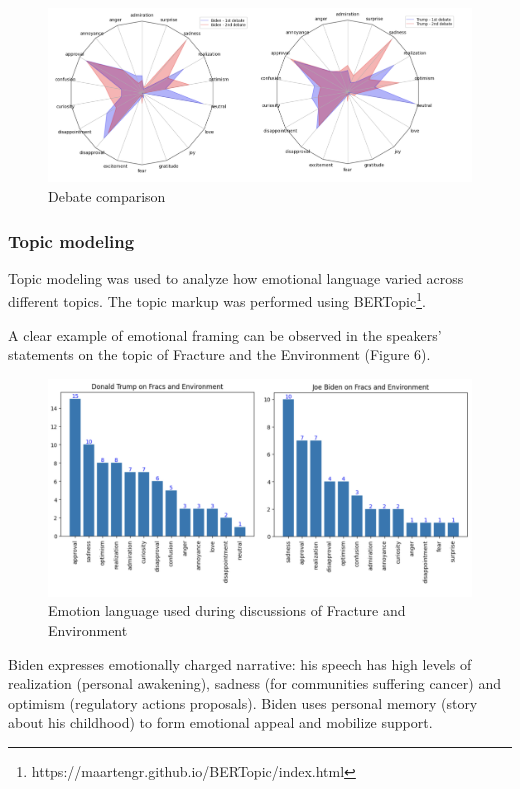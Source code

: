 \documentclass[pdflatex,sn-mathphys-num]{sn-jnl}%
\begin{document}
\begin{figure}[h]
	\centering
	\includegraphics[width=14cm]{f5-debate_comparison.png}
	\caption{Debate comparison}
\end{figure}

\subsubsection{Topic modeling}

Topic modeling was used to analyze how emotional language varied across different topics. The topic markup was performed using BERTopic\footnote{https://maartengr.github.io/BERTopic/index.html}.

A clear example of emotional framing can be observed in the speakers' statements on the topic of Fracture and the Environment (Figure 6).

\begin{figure}[H]
	\centering
	\includegraphics[width=14cm]{f6-fracture_and_environment.png}
	\caption{Emotion language used during discussions of Fracture and Environment}
\end{figure}

Biden expresses emotionally charged narrative: his speech has high levels of realization (personal awakening), sadness (for communities suffering cancer) and optimism (regulatory actions proposals). Biden uses personal memory (story about his childhood) to form emotional appeal and mobilize support.
\end{document}
